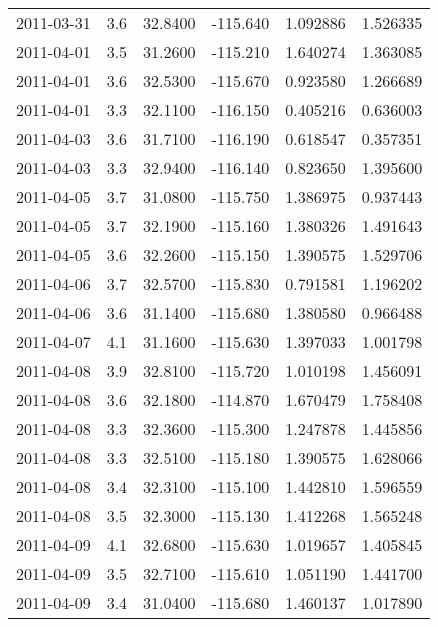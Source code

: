 \begin{tabular}{lrrrrr}
2011-03-31 &       3.6 &  32.8400 &  -115.640 &         1.092886 &         1.526335 \\
2011-04-01 &       3.5 &  31.2600 &  -115.210 &         1.640274 &         1.363085 \\
2011-04-01 &       3.6 &  32.5300 &  -115.670 &         0.923580 &         1.266689 \\
2011-04-01 &       3.3 &  32.1100 &  -116.150 &         0.405216 &         0.636003 \\
2011-04-03 &       3.6 &  31.7100 &  -116.190 &         0.618547 &         0.357351 \\
2011-04-03 &       3.3 &  32.9400 &  -116.140 &         0.823650 &         1.395600 \\
2011-04-05 &       3.7 &  31.0800 &  -115.750 &         1.386975 &         0.937443 \\
2011-04-05 &       3.7 &  32.1900 &  -115.160 &         1.380326 &         1.491643 \\
2011-04-05 &       3.6 &  32.2600 &  -115.150 &         1.390575 &         1.529706 \\
2011-04-06 &       3.7 &  32.5700 &  -115.830 &         0.791581 &         1.196202 \\
2011-04-06 &       3.6 &  31.1400 &  -115.680 &         1.380580 &         0.966488 \\
2011-04-07 &       4.1 &  31.1600 &  -115.630 &         1.397033 &         1.001798 \\
2011-04-08 &       3.9 &  32.8100 &  -115.720 &         1.010198 &         1.456091 \\
2011-04-08 &       3.6 &  32.1800 &  -114.870 &         1.670479 &         1.758408 \\
2011-04-08 &       3.3 &  32.3600 &  -115.300 &         1.247878 &         1.445856 \\
2011-04-08 &       3.3 &  32.5100 &  -115.180 &         1.390575 &         1.628066 \\
2011-04-08 &       3.4 &  32.3100 &  -115.100 &         1.442810 &         1.596559 \\
2011-04-08 &       3.5 &  32.3000 &  -115.130 &         1.412268 &         1.565248 \\
2011-04-09 &       4.1 &  32.6800 &  -115.630 &         1.019657 &         1.405845 \\
2011-04-09 &       3.5 &  32.7100 &  -115.610 &         1.051190 &         1.441700 \\
2011-04-09 &       3.4 &  31.0400 &  -115.680 &         1.460137 &         1.017890 \\

\end{tabular}

